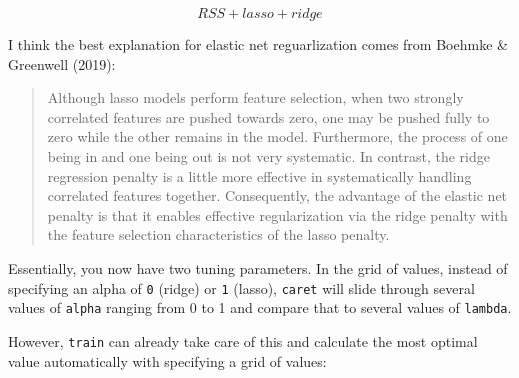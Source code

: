 \documentclass[
]{book}
\begin{document}
\[RSS + lasso + ridge\]

I think the best explanation for elastic net reguarlization comes from Boehmke \& Greenwell (2019):

\begin{quote}
Although lasso models perform feature selection, when two strongly correlated features are pushed towards zero, one may be pushed fully to zero while the other remains in the model. Furthermore, the process of one being in and one being out is not very systematic. In contrast, the ridge regression penalty is a little more effective in systematically handling correlated features together. Consequently, the advantage of the elastic net penalty is that it enables effective regularization via the ridge penalty with the feature selection characteristics of the lasso penalty.
\end{quote}

Essentially, you now have two tuning parameters. In the grid of values, instead of specifying an alpha of \texttt{0} (ridge) or \texttt{1} (lasso), \texttt{caret} will slide through several values of \texttt{alpha} ranging from 0 to 1 and compare that to several values of \texttt{lambda}.

However, \texttt{train} can already take care of this and calculate the most optimal value automatically with specifying a grid of values:
\end{document}
